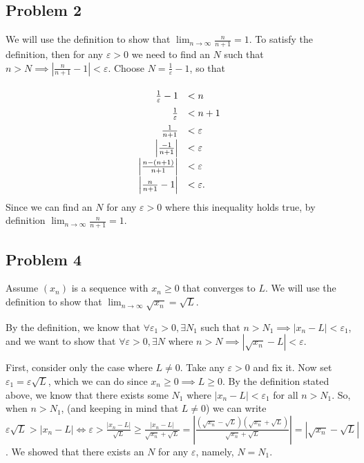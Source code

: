 \documentclass[11pt]{article}
\begin{document}
\subsection*{Problem 2}

We will use the definition to show that 
$\lim_{n \to \infty} \frac{n}{n+1} = 1$. To satisfy the definition,
then for any $\varepsilon > 0$ we need to find an $N$ such that 
$n > N \implies \left| \frac{n}{n+1} - 1\right| < \varepsilon$.
Choose $N = \frac{1}{\varepsilon} - 1$, so that

\[
\def\arraystretch{1.5}
\begin{array}{rl}
\frac{1}{\varepsilon}-1 &< n\\
\frac{1}{\varepsilon} &< n+1 \\
\frac{1}{n+1} &< \varepsilon \\
\left| \frac{-1}{n+1}\right| &< \varepsilon \\
\left| \frac{n - (n+1)}{n+1}\right| &< \varepsilon \\
\left| \frac{n}{n+1} - 1\right| &< \varepsilon. 
\end{array}
\]
Since we can find an $N$ for any $\varepsilon > 0$ where this inequality holds 
true, by definition $\lim_{n \to \infty} \frac{n}{n+1} = 1$.

\subsection*{Problem 4}

Assume $(x_n)$ is a sequence with $x_n \geq 0$ that converges to $L$.
We will use the definition to show that $\lim_{n\to\infty} \sqrt{x_n} = \sqrt{L}$.

By the definition, we know that $\forall \varepsilon_1 > 0, \exists N_1$ such that
$n > N_1 \implies |x_n - L| < \varepsilon_1$, and we want to show that 
$\forall \varepsilon > 0, \exists N$ where $n > N \implies 
\left| \sqrt{x_n} - L\right| < \varepsilon$. 

First, consider only the case where $L \neq 0$.
Take any $\varepsilon > 0$ and fix it. Now set $\varepsilon_1 = \varepsilon\sqrt{L}$,
which we can do since $x_n \geq 0 \implies L \geq 0$. By the definition stated
above, we know that there exists some $N_1$ where $|x_n-L| < \varepsilon_1$ for all
$n > N_1$. So, when $n > N_1$, (and keeping in mind that $L \neq 0$) we can write 
$\varepsilon\sqrt{L} > |x_n - L| \iff 
\varepsilon > \frac{\left|x_n - L\right|}{\sqrt{L}} \geq 
\frac{\left|x_n - L\right|}{\sqrt{x_n}+\sqrt{L}} =
\left| \frac{(\sqrt{x_n}-\sqrt{L})(\sqrt{x_n}+\sqrt{L})}{\sqrt{x_n}+\sqrt{L}} \right|
= \left|\sqrt{x_n} - \sqrt{L}\right|$.
We showed that there exists an $N$ for any $\varepsilon$, namely, $N = N_1$. 
\end{document}

